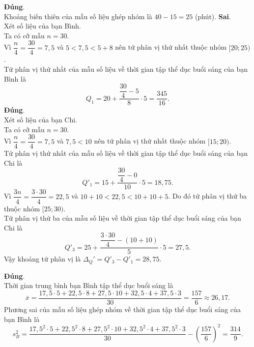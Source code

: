 \begin{ex}
{ \begin{itemchoice}
 \itemch \textbf{Đúng}. 
 \\Khoảng biến thiên của mẫu số liệu ghép nhóm là $40-15=25$ (phút).
 \itemch \textbf{Sai}. 
 \\Xét số liệu của bạn Bình.\\
 Ta có cỡ mẫu $n=30$.\\
 Vì $\dfrac{n}{4}=\dfrac{30}{4}=7{,}5$ và $5< 7{,}5< 5+8$ nên tứ phân vị thứ nhất thuộc nhóm $[20;25)$.\\
 Tứ phân vị thứ nhất của mẫu số liệu về thời gian tập thể dục buổi sáng của bạn Bình là \[Q_1=20+\dfrac{\dfrac{30}{4}-5}{8}\cdot5=\dfrac{345}{16}.\]
 \itemch \textbf{Đúng}. 
 \\Xét số liệu của bạn Chi.\\
 Ta có cỡ mẫu $n=30$.\\
 Vì $\dfrac{n}{4}=\dfrac{30}{4}=7{,}5$ và $7{,}5< 10$ nên tứ phân vị thứ nhất thuộc nhóm $[15;20)$.\\
 Tứ phân vị thứ nhất của mẫu số liệu về thời gian tập thể dục buổi sáng của bạn Chi là\\ \[Q'_1=15+\dfrac{\dfrac{30}{4}-0}{10} \cdot 5=18{,}75.\]
 Vì $\dfrac{3n}{4}=\dfrac{3 \cdot 30}{4}=22{,}5$ và $10+10< 22{,}5< 10+10+5$. Do đó tứ phân vị thứ ba thuộc nhóm $[25;30)$.\\
 Tứ phân vị thứ ba của mẫu số liệu về thời gian tập thể dục buổi sáng của bạn Chi là \[Q'_3=25+\dfrac{\dfrac{3\cdot30}{4}-(10+10)}{5}\cdot5=27{,}5.\]
 Vậy khoảng tứ phân vị là $\Delta_Q'=Q'_3-Q'_1=28{,}75$.
 
 \itemch \textbf{Đúng}. 
 \\Thời gian trung bình bạn Bình tập thể dục buổi sáng là
 \[\overline{x}=\dfrac{17{,}5\cdot5+22{,}5\cdot8+27{,}5\cdot10+32{,}5\cdot4+37{,}5\cdot3}{30}=\dfrac{157}{6} \approx 26{,}17.\]
 Phương sai của mẫu số liệu ghép nhóm về thời gian tập thể dục buổi sáng của bạn Bình là
 \[s_B^2=\dfrac{17{,}5^2\cdot5+22{,}5^2\cdot8+27{,}5^2\cdot10+32{,}5^2\cdot4+37{,}5^2\cdot3}{30}-\left(\dfrac{157}{6}\right)^2 =\dfrac{314}{9}.\]
 \end{itemchoice}
 }
\end{ex}

